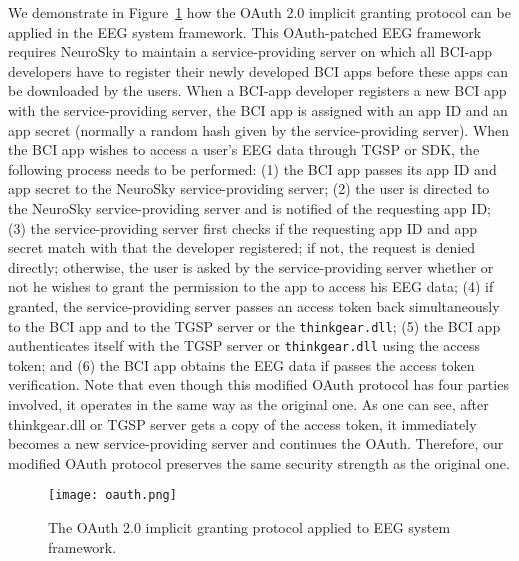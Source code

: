 We demonstrate in Figure~\ref{fig:oauth} how the OAuth 2.0 implicit granting protocol can be applied in the EEG system framework. This OAuth-patched EEG framework requires NeuroSky to maintain a service-providing server on which all BCI-app developers have to register their newly developed BCI apps before these apps can be downloaded by the users. When a BCI-app developer registers a new BCI app with the service-providing server, the BCI app is assigned with an app ID and an app secret (normally a random hash given by the service-providing server). When the BCI app wishes to access a user's EEG data through TGSP or SDK, the following process needs to be performed: (1) the BCI app passes its app ID and app secret %
to the NeuroSky service-providing server; (2) the user is directed to the NeuroSky service-providing server and is notified of the requesting app ID; (3) the service-providing server first checks if the requesting app ID and app secret match with that the developer registered; if not, the request is denied directly; otherwise, the user is asked by the service-providing server whether or not he wishes to grant the permission to the app to access his EEG data; (4) if granted, the service-providing server passes an access token back simultaneously to the BCI app and to the TGSP server or the \texttt{thinkgear.dll}; %
(5) the BCI app authenticates itself with the TGSP server or \texttt{thinkgear.dll} using the access token; and (6) the BCI app obtains the EEG data if passes the access token verification. 
Note that even though this modified OAuth protocol has four parties involved, it operates in the same way as the original one. As one can see, after thinkgear.dll or TGSP server gets a copy of the access token, it immediately becomes a new service-providing server and continues the OAuth. Therefore, our modified OAuth protocol preserves the same security strength as the original one. 


\begin{figure}[!htb]
\hspace*{2cm}
        \texttt{[image: oauth.png]}
	\caption{The OAuth 2.0 implicit granting protocol applied to EEG system framework. }
        \label{fig:oauth}
\end{figure}

